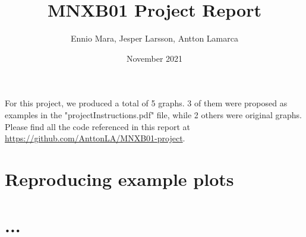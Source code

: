 \documentclass{article}
\title{MNXB01 Project Report}
\author{Ennio Mara, Jesper Larsson, Antton Lamarca }
\date{November 2021}
\begin{document}
\maketitle

For this project, we produced a total of 5 graphs. 3 of them were proposed as examples in the "projectInstructions.pdf" file, while 2 others were original graphs. Please find all the code referenced in this report at \url{https://github.com/AnttonLA/MNXB01-project}.

\section{Reproducing example plots}







\section{...}
\end{document}
